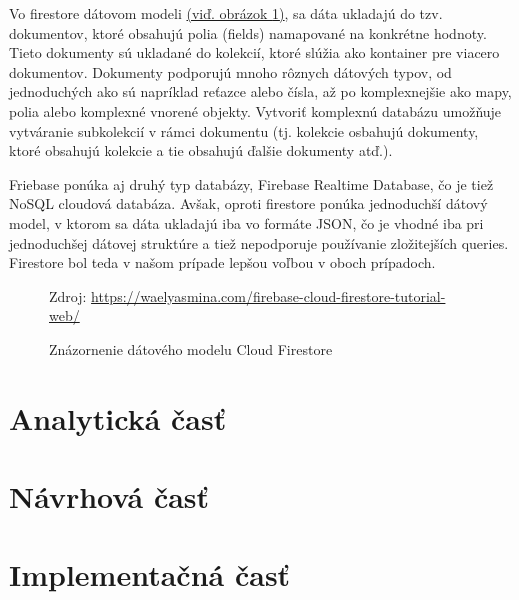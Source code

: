 Vo firestore dátovom modeli \hyperref[firestore]{(viď. obrázok \ref{firestore})}, sa dáta ukladajú do tzv. dokumentov, ktoré obsahujú polia (fields) namapované na konkrétne hodnoty. Tieto dokumenty sú ukladané do kolekcií, ktoré slúžia ako kontainer pre viacero dokumentov. Dokumenty podporujú mnoho rôznych dátových typov, od jednoduchých ako sú napríklad reťazce alebo čísla, až po komplexnejšie ako mapy, polia alebo komplexné vnorené objekty. Vytvoriť komplexnú databázu umožňuje vytváranie subkolekcií v rámci dokumentu (tj. kolekcie osbahujú dokumenty, ktoré obsahujú kolekcie a tie obsahujú ďalšie dokumenty atď.). \cite{firestoredoc}
  
Friebase ponúka aj druhý typ databázy, Firebase Realtime Database, čo je tiež NoSQL cloudová databáza. Avšak, oproti firestore ponúka jednoduchší dátový model, v ktorom sa dáta ukladajú iba vo formáte JSON, čo je vhodné iba pri jednoduchšej dátovej struktúre a tiež nepodporuje používanie zložitejších queries. Firestore bol teda v našom prípade lepšou voľbou v oboch prípadoch. \\

\begin{figure}[!htbp]
  \centering  
  \def\stackalignment{c}
           {\scriptsize%
            Zdroj: \url{https://waelyasmina.com/firebase-cloud-firestore-tutorial-web/}}
	\caption{Znázornenie dátového modelu Cloud Firestore}  
  \label{firestore}
\end{figure}






\section{Analytická časť}
\section{Návrhová časť}
\section{Implementačná časť}









